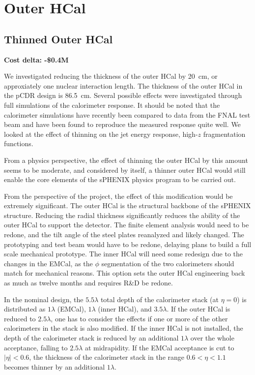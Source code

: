 \section{Outer HCal}
\subsection{Thinned Outer HCal}
\label{ohcal_thin}

\textbf{Cost delta: -\$0.4M}

We investigated reducing the thickness of the outer HCal by 20~cm, or
approxiately one nuclear interaction length.  The thickness of the
outer HCal in the pCDR design is 86.5~cm.  Several possible effects
were investigated through full \geant simulations of the calorimeter
response.  It should be noted that the calorimeter simulations have
recently been compared to data from the FNAL test beam and have been
found to reproduce the measured response quite well.  We looked at the
effect of thinning on the jet energy response, high-$z$ fragmentation
functions.

From a physics perspective, the effect of thinning the outer HCal by
this amount seems to be moderate, and considered by itself, a thinner
outer HCal would still enable the core elements of the sPHENIX physics
program to be carried out.

From the perspective of the project, the effect of this modification
would be extremely significant.  The outer HCal is the structural
backbone of the sPHENIX structure.  Reducing the radial thickness
significantly reduces the ability of the outer HCal to support the
detector.  The finite element analysis would need to be redone, and
the tilt angle of the steel plates reanalyzed and likely changed. The
prototyping and test beam would have to be redone, delaying plans to
build a full scale mechanical prototype.  The inner HCal will need
some redesign due to the changes in the EMCal, as the $\phi$
segmentation of the two calorimeters should match for mechanical
reasons.  This option sets the outer HCal engineering back as much as
twelve months and requires R\&D be redone.

In the nominal design, the $5.5 \lambda$ total depth of the
calorimeter stack (at $\eta = 0$) is distributed as $1 \lambda$
(EMCal), $1 \lambda$ (inner HCal), and $3.5 \lambda$.  If the outer
HCal is reduced to $2.5 \lambda$, one has to consider the effects if
one or more of the other calorimeters in the stack is also modified.
If the inner HCal is not installed, the depth of the calorimeter stack
is reduced by an additional $1 \lambda$ over the whole acceptance,
falling to $2.5 \lambda$ at midrapidity.  If the EMCal acceptance is
cut to $|\eta| < 0.6$, the thickness of the calorimeter stack in the
range $0.6 < \eta < 1.1$ becomes thinner by an additional $1 \lambda$.


